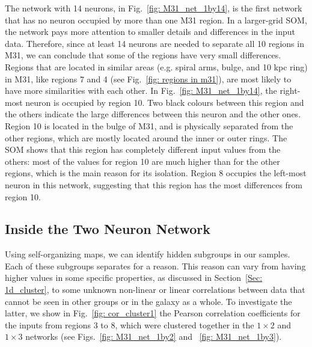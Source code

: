         The network with 14 neurons, in Fig.~\ref{fig: M31_net_1by14}, is the first network that has no neuron occupied by more than one M31 region.
        In a larger-grid SOM, the network pays more attention to smaller details and differences in the input data.
        Therefore, since at least 14 neurons are needed to separate all 10 regions in M31, we can conclude that some of the regions have very small differences.
        Regions that are located in similar areas (e.g. spiral arms, bulge, and 10 kpc ring) in M31, like regions 7 and 4 (see Fig.~\ref{fig: regions in m31}), are most likely to have more similarities with each other.
        In Fig.~\ref{fig: M31_net_1by14}, the right-most neuron is occupied by region 10.
        Two black colours between this region and the others indicate the large differences between this neuron and the other ones.
        Region 10 is located in the bulge of M31, and is physically separated from the other regions, which are mostly located around the inner or outer rings.
        The SOM shows that this region has completely different input values from the others: most of the values for region 10 are much higher than for the other regions, which is the main reason for its isolation.
        Region 8 occupies the left-most neuron in this network, suggesting that this region has the most differences from region 10.
        
    \subsection{Inside the Two Neuron Network}
        \label{sec: inside_the_2_neurons}
        Using self-organizing maps, we can identify hidden subgroups in our samples. 
        Each of these subgroups separates for a reason.
        This reason can vary from having higher values in some specific properties, as discussed in Section~\ref{Sec: 1d_cluster}, to some unknown non-linear or linear correlations between data that cannot be seen in other groups or in the galaxy as a whole.
        To investigate the latter, we show in Fig.~\ref{fig: cor_cluster1} the Pearson correlation coefficients for the inputs from regions 3 to 8, which were clustered together in the $1\times2$ and $1\times3$ networks (see Figs.~\ref{fig: M31_net_1by2} and ~\ref{fig: M31_net_1by3}).
        
